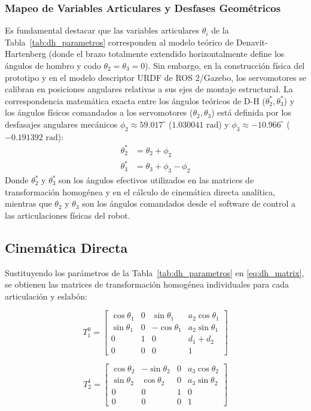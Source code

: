 \documentclass[conference,a4paper]{IEEEtran}
\begin{document}
\subsubsection{Mapeo de Variables Articulares y Desfases Geométricos}
Es fundamental destacar que las variables articulares $\theta_i$ de la Tabla~\ref{tab:dh_parametros} corresponden al modelo teórico de Denavit-Hartenberg (donde el brazo totalmente extendido horizontalmente define los ángulos de hombro y codo $\theta_2 = \theta_3 = 0$). Sin embargo, en la construcción física del prototipo y en el modelo descriptor URDF de ROS 2/Gazebo, los servomotores se calibran en posiciones angulares relativas a sus ejes de montaje estructural. La correspondencia matemática exacta entre los ángulos teóricos de D-H ($\theta_2^*, \theta_3^*$) y los ángulos físicos comandados a los servomotores ($\theta_2, \theta_3$) está definida por los desfasajes angulares mecánicos $\phi_2 \approx 59.017^\circ$ ($1.030041\text{ rad}$) y $\phi_3 \approx -10.966^\circ$ ($-0.191392\text{ rad}$):
\begin{align}
\theta_2^* &= \theta_2 + \phi_2 \\
\theta_3^* &= \theta_3 + \phi_3 - \phi_2
\end{align}
Donde $\theta_2^*$ y $\theta_3^*$ son los ángulos efectivos utilizados en las matrices de transformación homogénea y en el cálculo de cinemática directa analítica, mientras que $\theta_2$ y $\theta_3$ son los ángulos comandados desde el software de control a las articulaciones físicas del robot.

\subsection{Cinemática Directa}
Sustituyendo los parámetros de la Tabla~\ref{tab:dh_parametros} en \eqref{eq:dh_matrix}, se obtienen las matrices de transformación homogénea individuales para cada articulación y eslabón:

\begin{equation}
T_1^0 = \begin{bmatrix} \cos\theta_1 & 0 & \sin\theta_1 & a_2\cos\theta_1 \\ \sin\theta_1 & 0 & -\cos\theta_1 & a_2\sin\theta_1 \\ 0 & 1 & 0 & d_1 + d_2 \\ 0 & 0 & 0 & 1 \end{bmatrix}
\end{equation}

\begin{equation}
T_2^1 = \begin{bmatrix} \cos\theta_2 & -\sin\theta_2 & 0 & a_3\cos\theta_2 \\ \sin\theta_2 & \cos\theta_2 & 0 & a_3\sin\theta_2 \\ 0 & 0 & 1 & 0 \\ 0 & 0 & 0 & 1 \end{bmatrix}
\end{equation}
\end{document}
